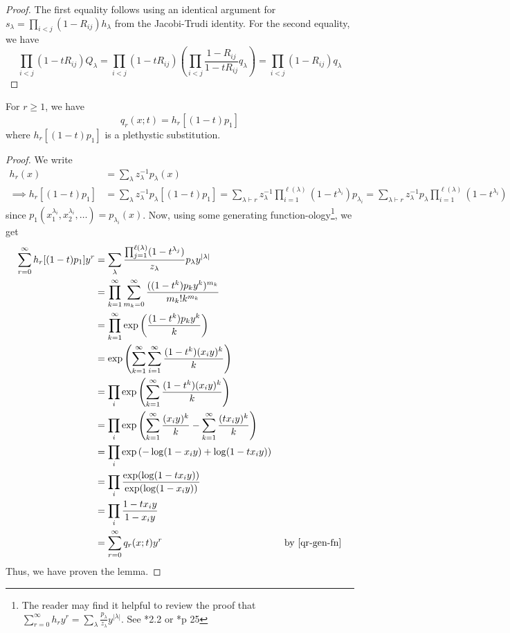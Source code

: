 \documentclass[11pt,leqno,oneside]{amsart}
\numberwithin{thm}{section}
\newcommand{\partitionof}{\vdash}
\begin{document}
\begin{proof}
  The first equality follows using an identical argument for
  \(s_\lambda = \prod_{i<j}(1-R_{ij}) h_\lambda\) from the
  Jacobi-Trudi identity. For the second equality, we have \[
    \prod_{i < j} (1-tR_{ij})Q_\lambda = \prod_{i <
      j}(1-tR_{ij})\left( \prod_{i<j} \frac{1-R_{ij}}{1-tR_{ij}}
      q_\lambda \right) = \prod_{i < j} (1-R_{ij}) q_\lambda
  \]
\end{proof}
\begin{lem}
  For \(r \geq 1\), we have \[
    q_r(x;t) = h_r[(1-t)p_{1}]
  \]
  where \(h_r[(1-t)p_{1}]\) is a plethystic substitution.
\end{lem}
\begin{proof}
  We write
  \begin{align*}
    h_r(x) & = \sum_{\lambda} z_\lambda^{-1} p_\lambda(x) \\
    \implies
    h_r[(1-t)p_1] & = \sum_{\lambda} z_\lambda^{-1} p_\lambda[(1-t)p_1]
    = \sum_{\lambda \partitionof r} z_\lambda^{-1}
    \prod_{i=1}^{\ell(\lambda)} (1-t^{\lambda_i}) p_{\lambda_i} 
    = \sum_{\lambda \partitionof r} z_\lambda^{-1} p_\lambda \prod_{i=1}^{\ell(\lambda)}(1-t^{\lambda_i})
  \end{align*}
  since \(p_1(x_1^{\lambda_i}, x_2^{\lambda_i}, \ldots) =
  p_{\lambda_i}(x)\).
  Now, using some generating function-ology\footnote{The reader may
    find it helpful to review the proof that \(\sum_{r=0}^\infty h_r
    y^r = \sum_\lambda \frac{p_\lambda}{z_\lambda}
    y^{|\lambda|}\). See \cite{alg-comb}*{2.2} or \cite{macdonald}*{p 25}}, we get
  \begin{align*}
    \sum_{r=0}^\infty h_r[(1-t)p_1] y^r
    & = \sum_\lambda
      \frac{\prod_{j=1}^{\ell(\lambda)} (1-t^{\lambda_j})}{z_\lambda} p_\lambda
      y^{|\lambda|} \\
    & = \prod_{k=1}^\infty\sum_{m_k=0}^\infty \frac{((1-t^k) p_k
      y^k)^{m_k}}{m_k! k^{m_k}}\\
    & = \prod_{k=1}^\infty \exp\left( \frac{(1-t^k)p_k y^k}{k}
      \right)\\
    & = \exp \left( \sum_{k=1}^\infty \sum_{i=1}^\infty
      \frac{(1-t^k)(x_i y)^k}{k} \right)\\
    & = \prod_i \exp\left( \sum_{k=1}^\infty \frac{(1-t^k)(x_i
      y)^k}{k} \right)\\
    & = \prod_i \exp\left( \sum_{k=1}^\infty \frac{(x_i y)^k}{k} -
      \sum_{k=1}^\infty \frac{(t x_i y)^k}{k} \right) \\
    & = \prod_i \exp\left( -\log(1-x_i y) + \log(1 - t x_i y) \right)
    \\
    & = \prod_i \frac{\exp(\log(1-tx_i y))}{\exp(\log(1- x_i y))} \\
    & = \prod_i \frac{1-t x_i y}{1 - x_i y} \\
    & = \sum_{r=0}^\infty q_r(x;t) y^r & \text{ by \ref{qr-gen-fn}}
  \end{align*}
  Thus, we have proven the lemma.
\end{proof}
\end{document}
